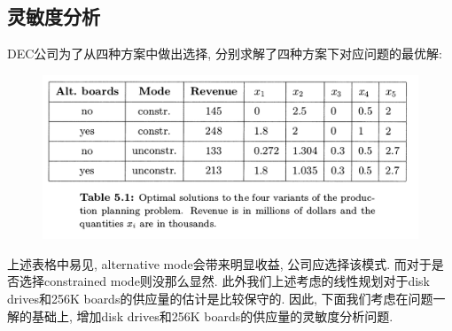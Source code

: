 \documentclass[10pt]{article}
\begin{document}
\subsection*{灵敏度分析}
DEC公司为了从四种方案中做出选择, 分别求解了四种方案下对应问题的最优解:
\begin{figure}[H]
	\centering
	\includegraphics[width=0.7\linewidth]{HW5_2.png}
	\label{fig.prob2}
\end{figure}
上述表格中易见, alternative mode会带来明显收益, 公司应选择该模式. 而对于是否选择constrained mode则没那么显然. 此外我们上述考虑的线性规划对于disk drives和256K boards的供应量的估计是比较保守的. 因此, 下面我们考虑在问题一解的基础上, 增加disk drives和256K boards的供应量的灵敏度分析问题.
\end{document}
